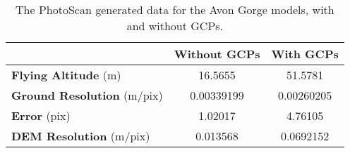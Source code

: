 \begin{table}
    \begin{tabularx}{\textwidth}{| X | c | c |}
        \hline
        & \textbf{Without GCPs} & \textbf{With GCPs} \\
        \hline
        \textbf{Flying Altitude} (m)       & 16.5655    & 51.5781    \\
        \textbf{Ground Resolution} (m/pix) & 0.00339199 & 0.00260205 \\
        \textbf{Error} (pix)               & 1.02017    & 4.76105    \\
        \textbf{DEM Resolution} (m/pix)    & 0.013568   & 0.0692152  \\
        \hline
    \end{tabularx}
    \caption{The PhotoScan generated data for the Avon Gorge models, with and
    without GCPs.}
    \label{tab:avon-gorge}
\end{table}
